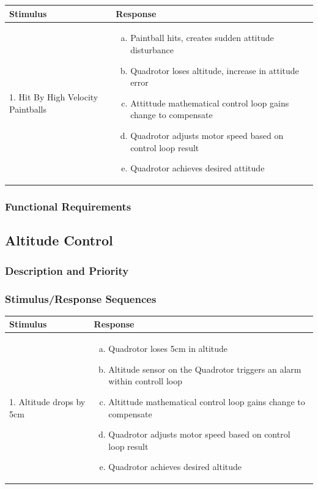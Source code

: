 \documentclass[english]{article}
\numberwithin{equation}{section} %
\begin{document}
\begin{longtable}{p{3cm} | p{10cm}}
\hline
\textbf{Stimulus} & \textbf{Response}\\
\hline
1. Hit By High Velocity Paintballs &
\begin{enumerate}[(a)]\itemsep1pt %
\item Paintball hits, creates sudden attitude disturbance
\item Quadrotor loses altitude, increase in attitude error
\item Attittude mathematical control loop gains change to compensate
\item Quadrotor adjusts motor speed based on control loop result
\item Quadrotor achieves desired attitude
\end{enumerate}
\\ 
\hline
\end{longtable}



\subsubsection{Functional Requirements}
\bigskip
\subsection{Altitude Control}
\subsubsection{Description and Priority}
\subsubsection{Stimulus/Response Sequences}

\begin{longtable}{p{3cm} | p{10cm}}
\hline
\textbf{Stimulus} & \textbf{Response}\\
\hline
1. Altitude drops by 5cm &
\begin{enumerate}[(a)]\itemsep1pt %
\item Quadrotor loses 5cm in altitude
\item Altitude sensor on the Quadrotor triggers an alarm within controll loop
\item Altittude mathematical control loop gains change to compensate
\item Quadrotor adjusts motor speed based on control loop result
\item Quadrotor achieves desired altitude
\end{enumerate}
\\ 
\hline
\end{longtable}
\end{document}
